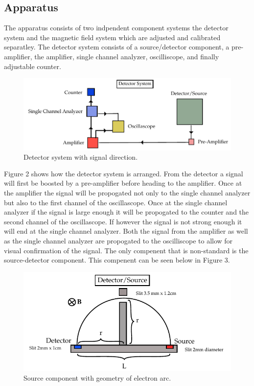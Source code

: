 \subsection{Apparatus}
The apparatus consists of two indpendent component systems the detector system and the magnetic field system which are adjusted and calibrated separatley.  The detector system consists of a source/detector component, a pre-amplifier, the amplifier, single channel analyzer, oscilliscope, and finally adjustable counter.

\begin{figure}[H]
\begin{center}
\includegraphics[width=4 in]{REM-figures.pdf}
\caption{Detector system with signal direction.}
\end{center}
\end{figure}

Figure 2 shows how the detector system is arranged.  From the detector a signal will first be boosted by a pre-amplifier before heading to the amplifier. Once at the amplifier the signal will be propogated not only to the single channel analyzer but also to the first channel of the  oscillascope.  Once at the single channel analyzer if the signal is large enough it will be propogated to the counter and the second channel of the oscillascope. If however the signal is not strong enough it will end at the single channel analyzer. Both the signal from the amplifier as well as the single channel analyzer are propogated to the oscilliscope to allow for visual confirmation of the signal.  
The only compenent that is non-standard is the source-detector component.  This compenent can be seen below in Figure 3.
 
\begin{figure}[H]
\begin{center}
\includegraphics[width=4 in]{REM-figures2.pdf}
\caption{Source component with geometry of electron arc.}
\end{center}
\end{figure}


